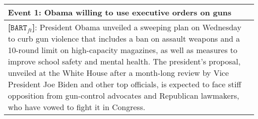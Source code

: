 \documentclass[11pt,a4paper]{article}
\newcommand{\finetune}{$\texttt{BART}_{ft}$}
\begin{document}
\begin{table*}[t]
\small
\begin{tabular}{p{15cm}}
\toprule
\textbf{Event 1: Obama willing to use executive orders on guns} \\ \midrule

\textbf{{[}\finetune{]}}: President Obama unveiled a sweeping plan on Wednesday to \colorbox{mypink}{curb gun violence} that includes a ban on assault weapons and a 10-round limit on high-capacity magazines, as well as measures to improve school safety and mental health. The president's proposal, unveiled at the White House after a month-long review by Vice President Joe Biden and other top officials, \colorbox{mypink}{is expected to face stiff opposition} from gun-control advocates and Republican lawmakers, \colorbox{mypink}{who have vowed to fight it in Congress.}\\\midrule


\end{tabular}
\end{table*}
\end{document}
